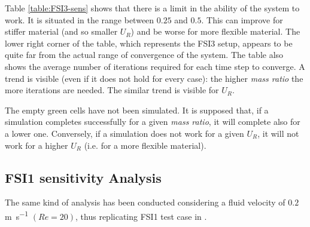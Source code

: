 Table \ref{table:FSI3-sens} shows that there is a limit in the ability of the system to work. It is situated in the range between $0.25$ and $0.5$. This can improve for stiffer material (and so smaller $U_R$) and be worse for more flexible material. The lower right corner of the table, which represents the FSI3 setup, appears to be quite far from the actual range of convergence of the system. The table also shows the average number of iterations required for each time step to converge. A trend is visible (even if it does not hold for every case): the higher \textit{mass ratio} the more iterations are needed. The similar trend is visible for $U_R$.


The empty green cells have not been simulated. It is supposed that, if a simulation completes successfully for a given \textit{mass ratio}, it will complete also for a lower one. Conversely, if a simulation does not work for a given $U_R$, it will not work for a higher $U_R$ (i.e. for a more flexible material).   


\subsection{FSI1 sensitivity Analysis}

The same kind of analysis has been conducted considering a fluid velocity of $0.2$\si{m.s^{-1}} $(Re=20)$, thus replicating FSI1 test case in \cite{turek2006proposal}.  

